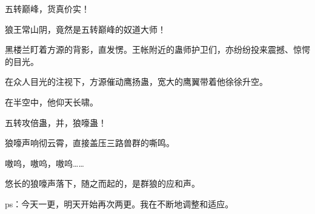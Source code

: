 \begin{this_body}
五转巅峰，货真价实！

狼王常山阴，竟然是五转巅峰的奴道大师！

黑楼兰盯着方源的背影，直发愣。王帐附近的蛊师护卫们，亦纷纷投来震撼、惊愕的目光。

在众人目光的注视下，方源催动鹰扬蛊，宽大的鹰翼带着他徐徐升空。

在半空中，他仰天长啸。

五转攻倍蛊，并，狼嚎蛊！

狼嚎声响彻云霄，直接盖压三路兽群的嘶鸣。

嗷呜，嗷呜，嗷呜……

悠长的狼嚎声落下，随之而起的，是群狼的应和声。

ps：今天一更，明天开始再次两更。我在不断地调整和适应。

\end{this_body}

